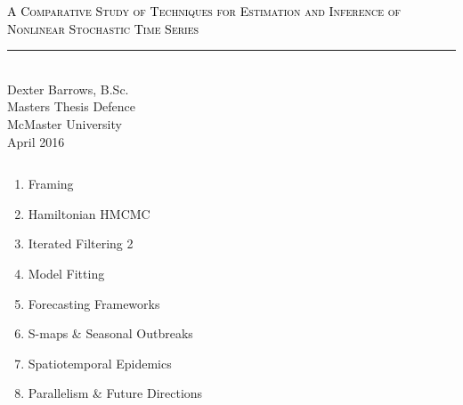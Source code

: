 \documentclass[12pt]{beamer}
\begin{document}
\begin{frame}

	\null
	\vfill
	\textcolor{black}{\textsc{\large A Comparative Study of Techniques for Estimation and Inference of Nonlinear Stochastic Time Series}} \\
	\vspace{1.5\baselineskip}
	\noindent\textcolor{black}{\rule{\textwidth}{0.4pt}} \\
	\vspace{2\baselineskip}
	Dexter Barrows, B.Sc. \\
	\vspace{1\baselineskip}
	Masters Thesis Defence \\
	McMaster University \\
	April 2016
	\vfill

\end{frame}


\begin{frame}

	\vspace{\baselineskip}
	\begin{columns}
		\begin{column}{0.8\textwidth}
			{\large
			\begin{enumerate}
				\item Framing
				\item Hamiltonian HMCMC
				\item Iterated Filtering 2
				\item Model Fitting
				\item Forecasting Frameworks
				\item S-maps \& Seasonal Outbreaks
				\item Spatiotemporal Epidemics
				\item Parallelism \& Future Directions
			\end{enumerate}
			}
		\end{column}
	\end{columns}

\end{frame}

\end{document}
